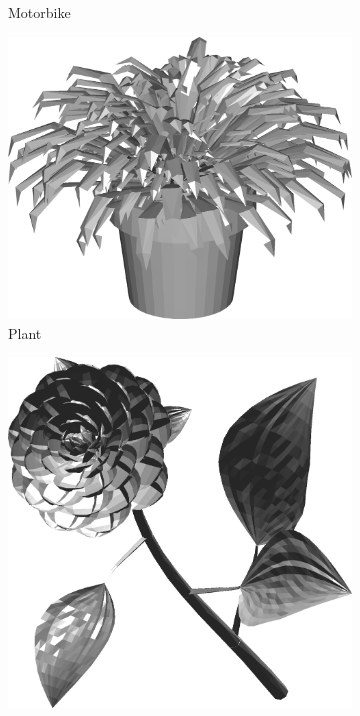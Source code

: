 \begin{figure}
\begin{subfigure}[t]{0.19\linewidth}
		\caption{Motorbike} 	
	\end{subfigure}
	\begin{subfigure}[t]{0.19\linewidth} \centering
		\includegraphics[width=1\linewidth]{./fig/eval/17plant.png}  
		\caption{Plant} 	
	\end{subfigure}
	\begin{subfigure}[t]{0.19\linewidth} \centering
		\includegraphics[width=1\linewidth]{./fig/eval/18rose.png}  

\end{subfigure}
\end{figure}
